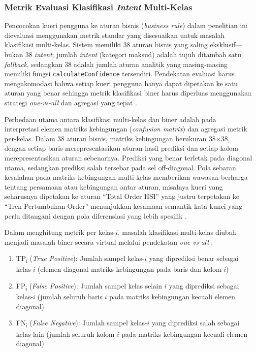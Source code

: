 \subsubsection{Metrik Evaluasi Klasifikasi \textit{Intent} Multi-Kelas}

Pencocokan kueri pengguna ke aturan bisnis (\textit{business rule}) dalam penelitian ini dievaluasi menggunakan metrik standar yang disesuaikan untuk masalah klasifikasi multi-kelas. Sistem memiliki 38 aturan bisnis yang saling eksklusif---bukan 38 \textit{intent}; jumlah \textit{intent} (kategori maksud) adalah tujuh ditambah satu \textit{fallback}, sedangkan 38 adalah jumlah aturan analitik yang masing-masing memiliki fungsi \texttt{calculateConfidence} tersendiri. Pendekatan evaluasi harus mengakomodasi bahwa setiap kueri pengguna hanya dapat dipetakan ke satu aturan yang benar sehingga metrik klasifikasi biner harus diperluas menggunakan strategi \textit{one-vs-all} dan agregasi yang tepat \autocite{Grandini2020MultiClassMetrics,EvidentlyMultiClass}.

Perbedaan utama antara klasifikasi multi-kelas dan biner adalah pada interpretasi elemen matriks kebingungan (\textit{confusion matrix}) dan agregasi metrik per-kelas. Dalam 38 aturan bisnis, matriks kebingungan berukuran 38$\times$38, dengan setiap baris merepresentasikan aturan hasil prediksi dan setiap kolom merepresentasikan aturan sebenarnya. Prediksi yang benar terletak pada diagonal utama, sedangkan prediksi salah tersebar pada sel off-diagonal. Pola sebaran kesalahan pada matriks kebingungan multi-kelas memberikan wawasan berharga tentang persamaan atau kebingungan antar aturan, misalnya kueri yang seharusnya dipetakan ke aturan ``Total Order HSI'' yang justru terpetakan ke ``Tren Pertumbuhan Order'' menunjukkan kesamaan semantik kata kunci yang perlu ditangani dengan pola diferensiasi yang lebih spesifik \autocite{EvidentlyMultiClass}.

Dalam menghitung metrik per kelas-\(i\), masalah klasifikasi multi-kelas diubah menjadi masalah biner secara virtual melalui pendekatan \textit{one-vs-all} \autocite{Grandini2020MultiClassMetrics}:

\begin{enumerate}[label=\alph*.]
    \item TP\textsubscript{i} (\textit{True Positive}): Jumlah sampel kelas-\(i\) yang diprediksi benar sebagai kelas-\(i\) (elemen diagonal matriks kebingungan pada baris dan kolom \(i\))
    
    \item FP\textsubscript{i} (\textit{False Positive}): Jumlah sampel kelas selain \(i\) yang diprediksi sebagai kelas-\(i\) (jumlah seluruh baris \(i\) pada matriks kebingungan kecuali elemen diagonal)
    
    \item FN\textsubscript{i} (\textit{False Negative}): Jumlah sampel kelas-\(i\) yang diprediksi salah sebagai kelas lain (jumlah seluruh kolom \(i\) pada matriks kebingungan kecuali elemen diagonal)
\end{enumerate}

